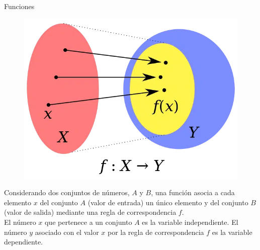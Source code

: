\begin{infocard}{Funciones}
    \begin{minipage}[t][][t]{0.35\textwidth}
        \begin{figure}[H]
            \centering
            \includegraphics[width=0.65\linewidth]{../images/Rango-de-una-funcion}
            \caption{}
            \label{fig:funciones}
        \end{figure}
    \end{minipage}\hfill
    \begin{minipage}[t][][t]{0.6\textwidth}
        Considerando dos conjuntos de números, $A$ y $B$, una función asocia a cada elemento
        $x$ del conjunto $A$ (valor de entrada) un único elemento y del conjunto $B$ (valor de
        salida) mediante una regla de correspondencia $f$.\\

        El número $x$ que pertenece a un conjunto $A$ es la variable independiente. El número
        $y$ asociado con el valor $x$ por la regla de correspondencia $f$ es la variable
        dependiente.
    \end{minipage}
\end{infocard}